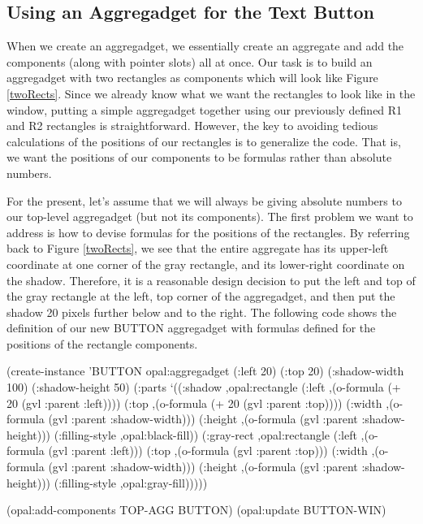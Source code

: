 \subsection{Using an Aggregadget for the Text Button}

When we create an aggregadget, we essentially create an aggregate and
add the components (along with pointer slots) all at once.  Our task
is to build an aggregadget
with two rectangles as components which will look like Figure
\ref{twoRects}.  Since we already know what we want the
rectangles to look like in the window, putting a simple aggregadget
together using our previously defined R1 and R2 rectangles is
straightforward.  However, the key to avoiding tedious
calculations of the positions of our rectangles is to generalize the
code.  That is, we want the positions of our components to be formulas
rather than absolute numbers.

For the present, let's assume that we will always be giving absolute
numbers to our top-level aggregadget (but not its components).  The first
problem we want to address
is how to devise formulas for the positions of the rectangles.
By referring back to Figure \ref{twoRects},
we see that the entire aggregate has its upper-left
coordinate at one corner of the gray rectangle, and its lower-right
coordinate on the shadow.  Therefore, it is a reasonable design
decision to put the left and top of the gray rectangle at the left,
top corner of the aggregadget, and then put the shadow 20 pixels
further below and to the right.  The following code shows the
definition of our new BUTTON aggregadget with formulas defined for the
positions of the rectangle components.

\begin{programexample}
(create-instance 'BUTTON opal:aggregadget
   (:left 20) (:top 20)
   (:shadow-width 100) (:shadow-height 50)
   (:parts
    `((:shadow ,opal:rectangle
	       (:left ,(o-formula (+ 20 (gvl :parent :left))))
	       (:top ,(o-formula (+ 20 (gvl :parent :top))))
	       (:width ,(o-formula (gvl :parent :shadow-width)))
	       (:height ,(o-formula (gvl :parent :shadow-height)))
	       (:filling-style ,opal:black-fill))
      (:gray-rect ,opal:rectangle
		  (:left ,(o-formula (gvl :parent :left)))
		  (:top ,(o-formula (gvl :parent :top)))
		  (:width ,(o-formula (gvl :parent :shadow-width)))
		  (:height ,(o-formula (gvl :parent :shadow-height)))
		  (:filling-style ,opal:gray-fill)))))

(opal:add-components TOP-AGG BUTTON)
(opal:update BUTTON-WIN)
\end{programexample}

